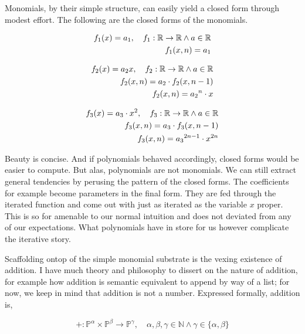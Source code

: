 \documentclass[12pt]{article}
\begin{document}
Monomials, by their simple structure, can easily yield a closed form through
modest effort. The following are the closed forms of the monomials.

\begin{align}
    f_1(x) = a_1, \quad f_1: \mathbb{R} \rightarrow \mathbb{R} \land a \in \mathbb{R} \notag \\
    f_1(x,n) = a_1
\end{align}

\begin{align}
    f_2(x) = a_2x, \quad f_2: \mathbb{R} \rightarrow \mathbb{R} \land a \in \mathbb{R} \notag \\
    f_2(x,n) = a_2 \cdot f_2(x,n-1) \notag                                                    \\
    f_2(x,n) = {a_2}^{n} \cdot x
\end{align}

\begin{align}
    f_3(x) = a_3 \cdot x^2, \quad f_3: \mathbb{R} \rightarrow \mathbb{R} \land a \in \mathbb{R} \notag \\
    f_3(x,n) = a_3 \cdot f_3(x,n-1) \notag                                                             \\
    f_3(x,n) = {a_3}^{2n - 1} \cdot x^{2n}
    \label{eq:closed-form-3}
\end{align}

Beauty is concise. And if polynomials behaved accordingly, closed forms would
be easier to compute. But alas, polynomials are not monomials. We can still
extract general tendencies by perusing the pattern of the closed forms. The
coefficients for example become parameters in the final form. They are fed
through the iterated function and come out with just as iterated as the
variable $x$ proper. This is so for amenable to our normal intuition and does
not deviated from any of our expectations. What polynomials have in store for
us however complicate the iterative story.

Scaffolding ontop of the simple monomial substrate is the vexing existence of
addition. I have much theory and philosophy to dissert on the nature of
addition, for example how addition is semantic equivalent to append by way of a
list; for now, we keep in mind that addition is not a number. Expressed
formally, addition is,

\begin{equation}
    +: \mathbb{P}^\alpha \times \mathbb{P}^\beta \rightarrow \mathbb{P}^\gamma, \quad \alpha, \beta, \gamma \in \mathbb{N} \land \gamma \in \{\alpha, \beta\}
\end{equation}
\end{document}
